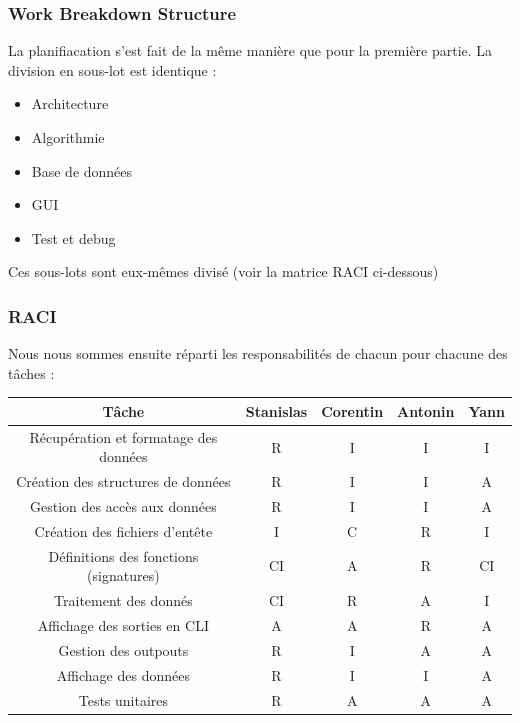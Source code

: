 \documentclass[a4paper, 12pt]{report}
\begin{document}
\subsubsection{Work Breakdown Structure}

La planifiacation s'est fait de la même manière que pour la première partie. La division en sous-lot est identique :

\begin{itemize}
    \item Architecture
    \item Algorithmie
    \item Base de données
    \item GUI
    \item Test et debug
\end{itemize}
\bigskip

Ces sous-lots sont eux-mêmes divisé (voir la matrice RACI ci-dessous)
\bigskip

\clearpage
\subsubsection{RACI}

Nous nous sommes ensuite réparti les responsabilités de chacun pour chacune des tâches :
\begin{table}[htbp]
    \centering\begin{tabular}{|c|c|c|c|c|}
        \hline
        Tâche & Stanislas & Corentin & Antonin & Yann \\
        \hline\hline
        Récupération et formatage des données & R & I & I & I \\
        \hline
        Création des structures de données & R & I & I & A \\
        \hline
        Gestion des accès aux données & R & I & I & A \\
        \hline
        Création des fichiers d'entête & I & C & R & I \\
        \hline
        Définitions des fonctions (signatures) & CI & A & R & CI \\
        \hline
        Traitement des donnés & CI & R & A & I \\
        \hline
        Affichage des sorties en CLI & A & A & R & A \\
        \hline
        Gestion des outpouts & R & I & A & A \\
        \hline
        Affichage des données & R & I & I & A \\
        \hline
        Tests unitaires & R & A & A & A \\
        \hline
        \end{tabular}
\end{table}
\end{document}
